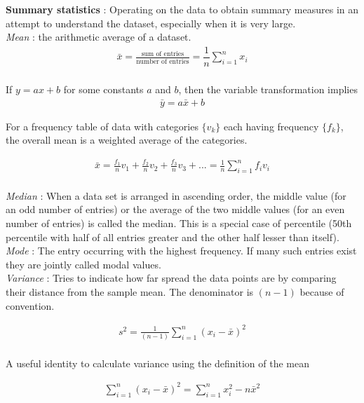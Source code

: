 \textbf{Summary statistics} : Operating on the data to obtain summary measures in an attempt to understand the dataset, especially when it is very large. \\

\textit{Mean} : the arithmetic average of a dataset.
\begin{align}
	\bar{x} = \frac{\text{sum of entries}}{\text{number of entries}} = \dfrac{1}{n} \sum\limits_{i = 1}^{n} x_{i} \\
\end{align}

If $ y = ax + b $ for some constants $ a $ and $ b $, then the variable transformation implies 
\begin{align}
	\bar{y} = a \bar{x} + b
\end{align}

For a frequency table of data with categories $ \{v_k\} $ each having frequency $ \{f_k\} $, the overall mean is a weighted average of the categories. 

\begin{align}
	\bar{x} = \frac{f_{1}}{n} v_{1} + \frac{f_{2}}{n} v_{2} + \frac{f_{3}}{n} v_{3} + ... = \frac{1}{n} \sum\limits_{i = 1}^{n} f_{i}v_{i}
\end{align} \\

\textit{Median} : When a data set is arranged in ascending order, the middle value (for an odd number of entries) or the average of the two middle values (for an even number of entries) is called the median. This is a special case of percentile (50th percentile with half of all entries greater and the other half lesser than itself). \\

\textit{Mode} : The entry occurring with the highest frequency. If many such entries exist they are jointly called modal values.\\

\textit{Variance} : Tries to indicate how far spread the data points are by comparing their distance from the sample mean. The denominator is $ (n - 1) $ because of convention.

\begin{align}
	s^2 = \frac{1}{(n-1)}\sum\limits_{i = 1}^{n}(x_{i} - \bar{x})^2
\end{align}\\

A useful identity to calculate variance using the definition of the mean

\begin{align}
	\sum\limits_{i = 1}^{n}(x_{i} - \bar{x})^2 = \sum\limits_{i = 1}^{n} x_{i}^2 - n \bar{x}^2
\end{align} \\

